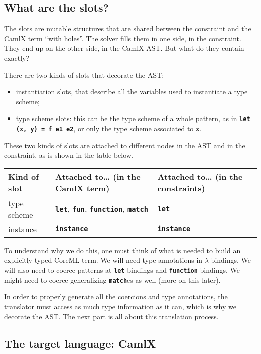 \documentclass[10pt,a4paper,twoside,titlepage,twocolumn]{article}
\newcommand{\code}[1]{\textbf{\texttt{#1}}}
\begin{document}
\subsection{What are the slots?}

The slots are mutable structures that are shared between the constraint and the
CamlX term ``with holes''. The solver fills them in one side, in the constraint.
They end up on the other side, in the CamlX AST. But what do they contain
exactly?

There are two kinds of slots that decorate the AST:
\begin{itemize}
  \item instantiation slots, that describe all the variables used to
    instantiate a type scheme;
  \item type scheme slots: this can be the type scheme of a whole pattern,
    as in \code{let (x, y) = f e1 e2}, or only the type scheme associated to
    \code{x}.
\end{itemize}

These two kinds of slots are attached to different nodes in the AST and in the
constraint, as is shown in the table below.

\begin{center}
  \small
  \begin{tabular}{l|p{2.5cm}|p{2.5cm}}
    \textbf{Kind of slot} & Attached to… (\textbf{in the CamlX term}) & Attached
    to… (\textbf{in the constraints}) \\
    \hline
    type scheme & \code{let}, \code{fun}, \code{function}, \code{match} & \code{let} \\
    \hline
    instance    & \code{instance} & \code{instance}
  \end{tabular}
\end{center}

To understand why we do this, one must think of what is needed to build an
explicitly typed CoreML term. We will need type annotations in
$\lambda$-bindings. We will also need to coerce patterns at \code{let}-bindings
and \code{function}-bindings.  We might need to coerce generalizing
\code{match}es as well (more on this later).

In order to properly generate all the coercions and type annotations, the
translator must access as much type information as it can, which is why we
decorate the AST. The next part is all about this translation process.

\subsection{The target language: CamlX}
\end{document}
